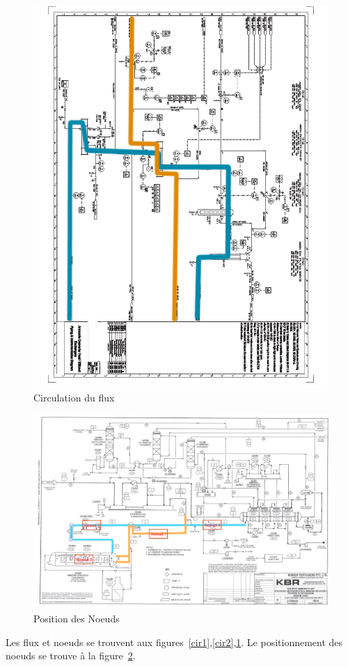 \documentclass[a4paper,12pt, oneside]{article}
\begin{document}
\begin{figure}
	\includegraphics[scale=0.5]{Plan2-2.png}
	\caption{Circulation du flux}
	\label{cir3}
	\end{figure}
\begin{figure}
\includegraphics[scale=0.4]{Position_des_differents_noeuds.png} 
	\caption{Position des  Noeuds}
	\label{cir4}
\end{figure}
Les flux et noeuds se trouvent aux figures~\ref{cir1},\ref{cir2},\ref{cir3}.
Le positionnement des noeuds se trouve à la figure~\ref{cir4}.
\end{document}
